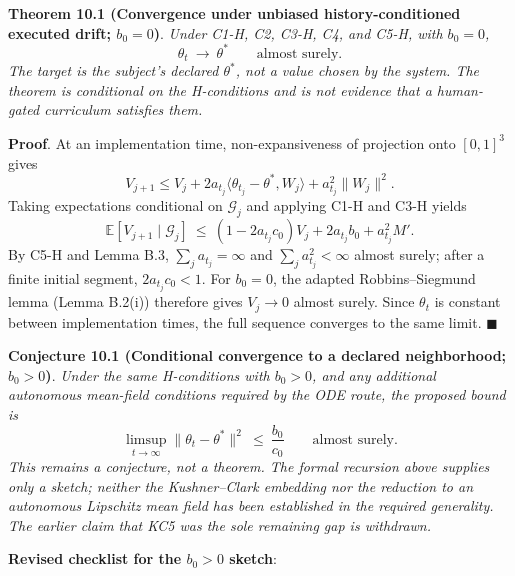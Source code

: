 \documentclass[
  11pt]{article}
\begin{document}
\textbf{Theorem 10.1 (Convergence under unbiased history-conditioned
executed drift; \(b_0=0\))}. \emph{Under C1-H, C2, C3-H, C4, and C5-H,
with \(b_0=0\),}
\[\theta_t\ \longrightarrow\ \theta^*\qquad\text{almost surely}.\]
\emph{The target is the subject's declared \(\theta^*\), not a value
chosen by the system. The theorem is conditional on the H-conditions and
is not evidence that a human-gated curriculum satisfies them.}

\textbf{Proof}. At an implementation time, non-expansiveness of
projection onto \([0,1]^3\) gives
\[V_{j+1}\le V_j+2a_{t_j}\langle\theta_{t_j}-\theta^*,W_j\rangle+a_{t_j}^2\|W_j\|^2.\]
Taking expectations conditional on \(\mathcal G_j\) and applying C1-H
and C3-H yields
\[\mathbb E[V_{j+1}\mid\mathcal G_j]\ \le\ (1-2a_{t_j}c_0)V_j+2a_{t_j}b_0+a_{t_j}^2M'.\]
By C5-H and Lemma B.3, \(\sum_ja_{t_j}=\infty\) and
\(\sum_ja_{t_j}^2<\infty\) almost surely; after a finite initial
segment, \(2a_{t_j}c_0<1\). For \(b_0=0\), the adapted Robbins--Siegmund
lemma (Lemma B.2(i)) therefore gives \(V_j\to0\) almost surely. Since
\(\theta_t\) is constant between implementation times, the full sequence
converges to the same limit. \(\blacksquare\)

\textbf{Conjecture 10.1 (Conditional convergence to a declared
neighborhood; \(b_0>0\))}. \emph{Under the same H-conditions with
\(b_0>0\), and any additional autonomous mean-field conditions required
by the ODE route, the proposed bound is}
\[\limsup_{t\to\infty}\|\theta_t-\theta^*\|^2\ \le\ \frac{b_0}{c_0}\qquad\text{almost surely}.\]
\emph{This remains a conjecture, not a theorem. The formal recursion
above supplies only a sketch; neither the Kushner--Clark embedding nor
the reduction to an autonomous Lipschitz mean field has been established
in the required generality. The earlier claim that KC5 was the sole
remaining gap is withdrawn.}

\textbf{Revised checklist for the \(b_0>0\) sketch}:
\end{document}
